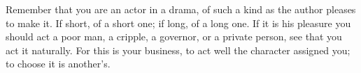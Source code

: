 Remember that you are an actor in a drama, of such a kind as the
author pleases to make it. If short, of a short one; if long, of a
long one. If it is his pleasure you should act a poor man, a cripple,
a governor, or a private person, see that you act it naturally. For
this is your business, to act well the character assigned you; to
choose it is another's. 
